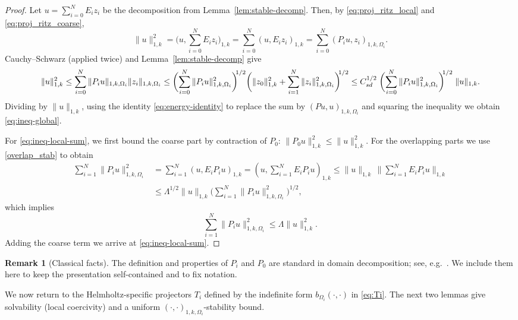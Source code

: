 \documentclass[preprint,3p,times]{elsarticle}
\newcommand{\Csd}{C_{\textup{\textsf{sd}}}}
\theoremstyle{definition}
\newtheorem{remark}[theorem]{Remark}
\numberwithin{equation}{section}
\begin{document}
\begin{proof}
Let $u=\sum_{i=0}^N E_i z_i$ be the decomposition from Lemma~\ref{lem:stable-decomp}. 
Then, by \eqref{eq:proj_ritz_local} and \eqref{eq:proj_ritz_coarse},
\[
	\|u\|_{1, k}^2 = \biggl(u, \sum_{i=0}^N E_i z_i\biggr)_{1, k}
	= \sum_{i=0}^N (u,E_i z_i)_{1, k}
	= \sum_{i=0}^N (P_i u, z_i)_{1, k, \Omega_i}.
\]
Cauchy--Schwarz (applied twice) and Lemma~\ref{lem:stable-decomp} give
\[
	\|u\|_{1,k}^2 \le \sum_{i=0}^N \|P_i u\|_{1,k,\Omega_i}\|z_i\|_{1,k,\Omega_i}
	\le \biggl(\sum_{i=0}^N \|P_i u\|_{1,k,\Omega_i}^2\biggr)^{\!\!1/2}
	\biggl(\|z_0\|_{1,k}^2+\sum_{i=1}^N \|z_i\|_{1,k,\Omega_i}^2\biggr)^{\!\!1/2}
	\le \Csd^{1/2}\; \biggl(\sum_{i=0}^N \|P_i u\|_{1,k,\Omega_i}^2\biggr)^{\!\!1/2}\;\|u\|_{1,k}.
\]
Dividing by $\|u\|_{1,k}$, using the identity \eqref{eq:energy-identity} to replace the sum by $(Pu,u)_{1,k,\Omega_i}$ 
and squaring the inequality we obtain \eqref{eq:ineq-global}.

For \eqref{eq:ineq-local-sum}, we first bound the coarse part by contraction of $P_0$:
$\|P_0 u\|_{1,k}^2 \le \|u\|_{1,k}^2$.
For the overlapping parts we use \eqref{overlap_stab} to obtain
\begin{align*}
	\sum_{i=1}^N \|P_i u\|_{1,k,\Omega_i}^2
	&= \sum_{i=1}^N (u,E_i P_i u)_{1,k}
	= \left(u, \sum_{i=1}^N E_i P_i u\right)_{1,k}
	\le \|u\|_{1,k} \,\Big\|\sum_{i=1}^N E_i P_i u\Big\|_{1,k}
	\\[1ex]
	&\le \Lambda^{1/2}\|u\|_{1,k} \Biggl(\sum_{i=1}^N \|P_i u\|_{1,k,\Omega_i}^2\Biggr)^{1/2},
\end{align*}
which implies 
\begin{equation}\label{sum_norm_P_i}
	\sum_{i=1}^N \|P_i u\|_{1,k,\Omega_i}^2 \le \Lambda \|u\|_{1,k}^2.
\end{equation} 
Adding the coarse term we arrive at \eqref{eq:ineq-local-sum}.
\end{proof}

\begin{remark}[Classical facts]
The definition and properties of $P_i$ and $P_0$ are standard in domain decomposition; 
see, e.g.\ \cite[Sec.~2.2]{Toselli:2005:DDM}. We include them here to keep the presentation self-contained and to fix notation.
\end{remark}

\medskip

We now return to the Helmholtz-specific projectors $T_i$ defined by the indefinite form $b_{\Omega_i}(\cdot,\cdot)$ in \eqref{eq:Ti}. 
The next two lemmas give solvability (local coercivity) and a uniform $(\cdot, \cdot)_{1, k, \Omega_i}$-stability bound.
\end{document}
